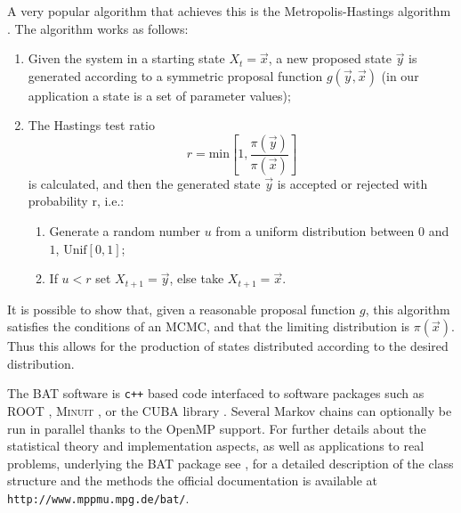 A very popular algorithm that achieves this is the Metropolis-Hastings algorithm \cite{Metropolis,Hastings}. The algorithm works as follows:
\begin{enumerate}
	\item Given the system in a starting state $X_t=\vec{x}$, a new proposed state $\vec{y}$ is generated according to a symmetric proposal function $g(\vec{y},\vec{x})$ (in our application a state is a set of parameter values);
	\item The Hastings test ratio
		\[r=\text{min}\left[1,\frac{\pi(\vec{y})}{\pi(\vec{x})}\right]\]
		is calculated, and then the generated state $\vec{y}$ is accepted or rejected with probability r, i.e.:
		\begin{enumerate}
			\item Generate a random number $u$ from a uniform distribution between $0$ and $1$, $\text{Unif}[0,1]$;
			\item If $u<r$ set $X_{t+1}=\vec{y}$, else take $X_{t+1}=\vec{x}$.
		\end{enumerate}
\end{enumerate}
It is possible to show that, given a reasonable proposal function $g$, this algorithm satisfies the conditions of an MCMC, and that the limiting distribution is $\pi(\vec{x})$. Thus this allows for the production of states distributed according to the desired distribution.

 The BAT software is \texttt{c++} based code interfaced to software packages such as ROOT \cite{ROOT}, \textsc{Minuit} \cite{MINUIT}, or the CUBA library \cite{CUBA}. Several Markov chains can optionally be run in parallel thanks to the OpenMP \cite{openmp} support. For further details about the statistical theory and implementation aspects, as well as applications to real problems, underlying the BAT package see \cite{BAT}, for a detailed description of the class structure and the methods the official documentation is available at \texttt{http://www.mppmu.mpg.de/bat/}.

